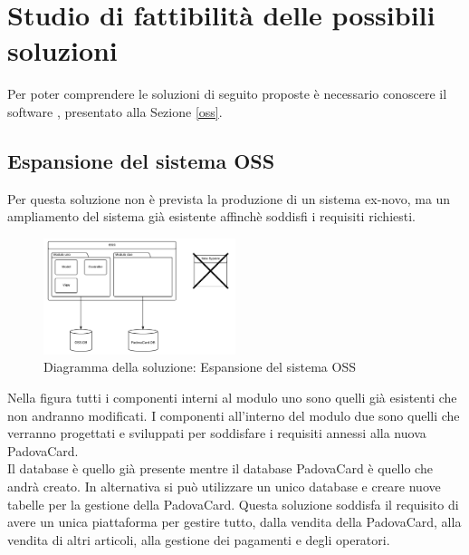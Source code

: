 \section{Studio di fattibilità delle possibili soluzioni}
Per poter comprendere le soluzioni di seguito proposte è necessario conoscere il software , presentato alla Sezione \ref{oss}.

\subsection{Espansione del sistema OSS}
Per questa soluzione non è prevista la produzione di un sistema ex-novo, ma un ampliamento del sistema  già esistente affinchè soddisfi i requisiti richiesti.
\begin{figure}[H]
\centering
\includegraphics[width=0.5\textwidth]{images/Espansione_del_sistema_OSS.png}
\caption{Diagramma della soluzione: Espansione del sistema OSS}
\end{figure}
Nella figura tutti i componenti interni al modulo uno sono quelli già esistenti che non andranno modificati.
I componenti all'interno del modulo due sono quelli che verranno progettati e sviluppati per soddisfare i requisiti annessi alla nuova PadovaCard.\\

Il database  è quello già presente mentre il database PadovaCard è quello che andrà creato. In alternativa si può utilizzare un unico database e creare nuove tabelle per la gestione della PadovaCard.
Questa soluzione soddisfa il requisito di avere un unica piattaforma per gestire tutto, dalla vendita della PadovaCard, alla vendita di altri articoli, alla gestione dei pagamenti e degli operatori.\\

